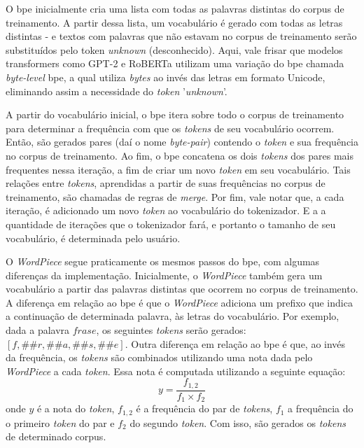 O \gls{bpe} inicialmente cria uma lista com todas as palavras distintas do corpus de treinamento. A partir dessa lista, um vocabulário é gerado com todas as letras distintas - e textos com palavras que não estavam no corpus de treinamento serão substituídos pelo token \textit{unknown} (desconhecido). Aqui, vale frisar que modelos transformers como GPT-2 e RoBERTa utilizam uma variação do \gls{bpe} chamada \textit{byte-level} \gls{bpe}, a qual utiliza \textit{bytes} ao invés das letras em formato Unicode, eliminando assim a necessidade do \textit{token} '\textit{unknown}'.

A partir do vocabulário inicial, o \gls{bpe} itera sobre todo o corpus de treinamento para determinar a frequência com que os \textit{tokens} de seu vocabulário ocorrem. Então, são gerados pares (daí o nome \textit{byte-pair}) contendo o \textit{token} e sua frequência no corpus de treinamento. Ao fim, o \gls{bpe} concatena os dois \textit{tokens} dos pares mais frequentes nessa iteração, a fim de criar um novo \textit{token} em seu vocabulário. Tais relações entre \textit{tokens}, aprendidas a partir de suas frequências no corpus de treinamento, são chamadas de regras de \textit{merge}. Por fim, vale notar que, a cada iteração, é adicionado um novo \textit{token} ao vocabulário do tokenizador. E a a quantidade de iterações que o tokenizador fará, e portanto o tamanho de seu vocabulário, é determinada pelo usuário.

O \textit{WordPiece} segue praticamente os mesmos passos do \gls{bpe}, com algumas diferenças da implementação. Inicialmente, o \textit{WordPiece} também gera um vocabulário a partir das palavras distintas que ocorrem no corpus de treinamento. A diferença em relação ao \gls{bpe} é que o \textit{WordPiece} adiciona um prefixo que indica a continuação de determinada palavra, às letras do vocabulário. Por exemplo, dada a palavra $frase$, os seguintes \textit{tokens} serão gerados: $[f, \#\#r, \#\#a, \#\#s, \#\#e]$. Outra diferença em relação ao \gls{bpe} é que, ao invés da frequência, os \textit{tokens} são combinados utilizando uma nota dada pelo \textit{WordPiece} a cada \textit{token}. Essa nota é computada utilizando a seguinte equação:
\begin{equation*}
y=\frac{f_{1,2}}{f_1 \times f_2}
\end{equation*}
onde $y$ é a nota do \textit{token}, $f_{1,2}$ é a frequência do par de \textit{tokens}, $f_1$ a frequência do o primeiro \textit{token} do par e $f_2$ do segundo \textit{token}. Com isso, são gerados os \textit{tokens} de determinado corpus.

